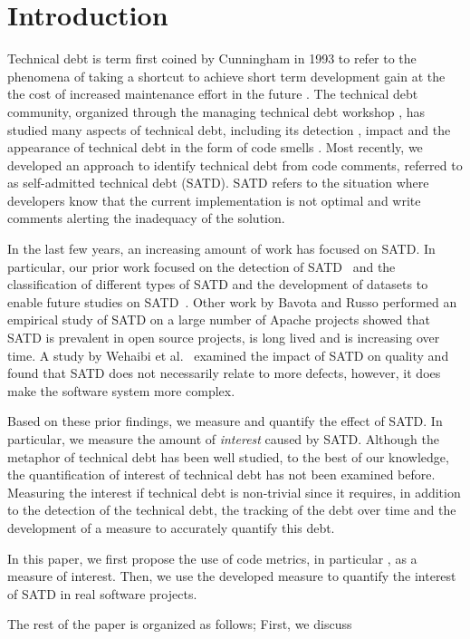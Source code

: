 \section{Introduction}
Technical debt is term first coined by Cunningham in 1993 to refer to the phenomena of taking a shortcut to achieve short term development gain at the the cost of increased maintenance effort in the future \cite{Cunningham1992WPM}. The technical debt community, organized through the managing technical debt workshop \cite{Falessi2014MTD}, has studied many aspects of technical debt, including its detection \cite{Zazworka2013CSE}, impact \cite{Zazworka2011MTD}
and the appearance of technical debt in the form of code smells \cite{Fontana2012MTD}. Most recently, we developed an approach to identify technical debt from code comments, referred to as self-admitted technical debt (SATD). SATD refers to the situation where developers know that the current implementation is not optimal and write comments alerting the inadequacy of the solution.

In the last few years, an increasing amount of work has focused on SATD. In particular, our prior work focused on the detection of SATD~\cite{Potdar2014ICSME} and the classification of different types of SATD and the development of datasets to enable future studies on SATD~\cite{Maldonado2015MTD}. Other work by Bavota and Russo performed an empirical study of SATD on a large number of Apache projects showed that SATD is prevalent in open source projects, is long lived and is increasing over time. A study by Wehaibi et al.~\cite{Wehaibi2016SANER} examined the impact of SATD on quality and found that SATD does not necessarily relate to more defects, however, it does make the software system more complex. 

Based on these prior findings, we measure and quantify the effect of SATD. In particular, we measure the amount of \emph{interest} caused by SATD. Although the metaphor of technical debt has been well studied, to the best of our knowledge, the quantification of interest of technical debt has not been examined before. Measuring the interest if technical debt is non-trivial since it requires, in addition to the detection of the technical debt, the tracking of the debt over time and the development of a measure to accurately quantify this debt. 


In this paper, we first propose the use of code metrics, in particular , as a measure of interest. Then, we use the developed measure to quantify the interest of SATD in real software projects.

The rest of the paper is organized as follows; First, we discuss 